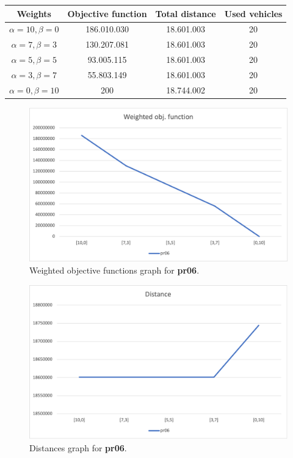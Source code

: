 {
\renewcommand{\arraystretch}{2}
\begin{longtable}[h]{| c | c | c | c |}
    \hline
    \textbf{Weights} & \textbf{Objective function} & \textbf{Total distance} & \textbf{Used vehicles} \\
    \hline
    \endhead
    $\alpha = 10, \beta = 0$ & 186.010.030 & 18.601.003 & 20 \\
    \hline
    $\alpha = 7, \beta = 3$  & 130.207.081 & 18.601.003 & 20 \\
    \hline
    $\alpha = 5, \beta = 5$  &  93.005.115 & 18.601.003 & 20 \\
    \hline
    $\alpha = 3, \beta = 7$  &  55.803.149 & 18.601.003 & 20 \\
    \hline
    $\alpha = 0, \beta = 10$ &         200 & 18.744.002 & 20 \\
    \hline
\end{longtable}
}
\begin{figure}[H]
    \centering
    \includegraphics[height=0.25\textheight]{../graphs/pr06-wobjf.png}
    \caption{Weighted objective functions graph for \textbf{pr06}.}
\end{figure}

\begin{figure}[H]
    \centering
    \includegraphics[height=0.25\textheight]{../graphs/pr06-distance.png}
    \caption{Distances graph for \textbf{pr06}.}
\end{figure}


